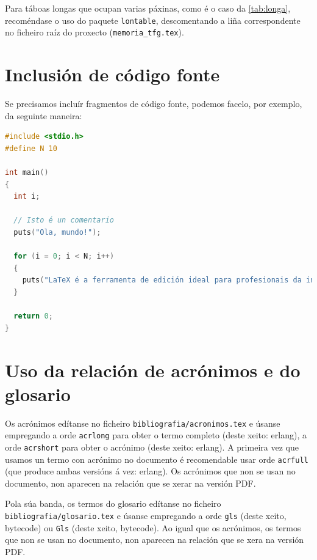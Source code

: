 Para táboas longas que ocupan varias páxinas, como é o caso da \ref{tab:longa},
recoméndase o uso do paquete \texttt{lontable}, descomentando a liña
correspondente no ficheiro raíz do proxecto (\verb+memoria_tfg.tex+).



\section{Inclusión de código fonte}

Se precisamos incluír fragmentos de código fonte, podemos facelo, por exemplo, da
seguinte maneira:

\begin{lstlisting}[language=C]
#include <stdio.h>
#define N 10

int main()
{
  int i;

  // Isto é un comentario
  puts("Ola, mundo!");

  for (i = 0; i < N; i++)
  {
    puts("LaTeX é a ferramenta de edición ideal para profesionais da informática!");
  }

  return 0;
}
\end{lstlisting}

\section{Uso da relación de acrónimos e do glosario}

Os acrónimos edítanse no ficheiro \texttt{bibliografia/acronimos.tex}
e úsanse empregando a orde \texttt{acrlong} para obter o termo
completo (deste xeito: \acrlong{erlang}), a orde \texttt{acrshort}
para obter o acrónimo (deste xeito: \acrshort{erlang}). A primeira vez
que usamos un termo con acrónimo no documento é recomendable usar orde
\texttt{acrfull} (que produce ambas versións á vez:
\acrfull{erlang}). Os acrónimos que non se usan no documento, non
aparecen na relación que se xerar na versión PDF.

Pola súa banda, os termos do glosario edítanse no ficheiro
\texttt{bibliografia/glo\-sa\-rio.tex} e úsanse empregando a orde
\texttt{gls} (deste xeito, \gls{bytecode}) ou \texttt{Gls} (deste
xeito, \Gls{bytecode}). Ao igual que os acrónimos, os termos que non
se usan no documento, non aparecen na relación que se xera na versión
PDF.
